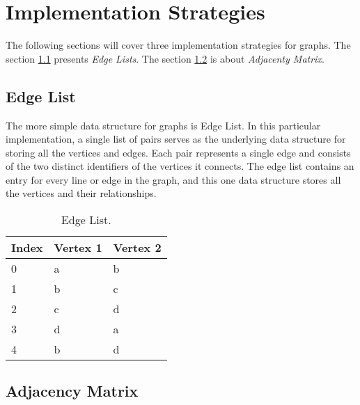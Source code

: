 \documentclass[a4paper]{article}
\begin{document}
    \section{Implementation Strategies}    
    
    The following sections will cover three implementation strategies for graphs.
    The section \ref{edgelist} presents \emph{Edge Lists}.
    The section \ref{adjacency_matrix} is about \emph{Adjacenty Matrix}.

    \subsection{Edge List} \label{edgelist}

    The more simple data structure for graphs is Edge List.
    In this particular implementation, a single list of pairs serves as the 
    underlying data structure for storing all the vertices and edges. Each pair 
    represents a single edge and consists of the two distinct identifiers of the 
    vertices it connects. The edge list contains an entry for every line or edge 
    in the graph, and this one data structure stores all the vertices and their 
    relationships.

    \begin{table}[H]
        \centering
        \caption{\label{tab:edge-list}Edge List.}
        \vspace*{10pt}
        \begin{tabular}{ |l|l|l| } 
            \hline
            Index & Vertex 1 & Vertex 2 \\
            \hline
            0   & a & b \\
            \hline
            1   & b & c \\
            \hline
            2   & c & d \\
            \hline
            3   & d & a \\
            \hline
            4   & b & d \\
            \hline            
        \end{tabular}
    \end{table}


    \subsection{Adjacency Matrix} \label{adjacency_matrix}
\end{document}
